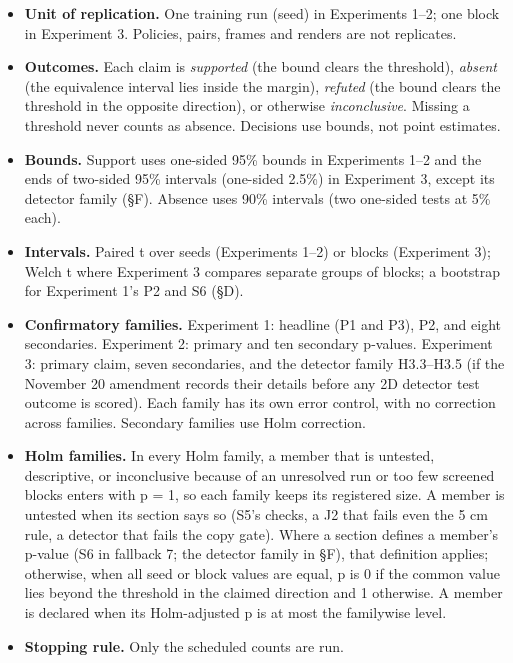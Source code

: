 \documentclass[10pt,letterpaper]{article}
\providecommand{\tightlist}{\setlength{\itemsep}{0pt}\setlength{\parskip}{0pt}}
\begin{document}
\begin{itemize}
\tightlist
\item
  \textbf{Unit of replication.} One training run (seed) in
  Experiments 1--2; one block in Experiment 3. Policies,
  pairs, frames and renders are not replicates.
\item
  \textbf{Outcomes.} Each claim is \emph{supported} (the
  bound clears the threshold), \emph{absent} (the
  equivalence interval lies inside the margin),
  \emph{refuted} (the bound clears the threshold in the
  opposite direction), or otherwise \emph{inconclusive}.
  Missing a threshold never counts as absence. Decisions use
  bounds, not point estimates.
\item
  \textbf{Bounds.} Support uses one-sided 95\% bounds in
  Experiments 1--2 and the ends of two-sided 95\% intervals
  (one-sided 2.5\%) in Experiment 3, except its detector
  family (§F). Absence uses 90\% intervals (two one-sided
  tests at 5\% each).
\item
  \textbf{Intervals.} Paired t over seeds (Experiments 1--2)
  or blocks (Experiment 3); Welch t where Experiment 3
  compares separate groups of blocks; a bootstrap for
  Experiment 1's P2 and S6 (§D).
\item
  \textbf{Confirmatory families.} Experiment 1: headline (P1
  and P3), P2, and eight secondaries. Experiment 2: primary
  and ten secondary p-values. Experiment 3: primary claim,
  seven secondaries, and the detector family H3.3--H3.5 (if
  the November 20 amendment records their details before any
  2D detector test outcome is scored). Each family has its
  own error control, with no correction across families.
  Secondary families use Holm correction.
\item
  \textbf{Holm families.} In every Holm family, a member
  that is untested, descriptive, or inconclusive because of
  an unresolved run or too few screened blocks enters with p
  = 1, so each family keeps its registered size. A member is
  untested when its section says so (S5's checks, a J2 that
  fails even the 5 cm rule, a detector that fails the copy
  gate). Where a section defines a member's p-value (S6 in
  fallback 7; the detector family in §F), that definition
  applies; otherwise, when all seed or block values are
  equal, p is 0 if the common value lies beyond the
  threshold in the claimed direction and 1 otherwise. A
  member is declared when its Holm-adjusted p is at most the
  familywise level.
\item
  \textbf{Stopping rule.} Only the scheduled counts are run.

\end{itemize}
\end{document}
